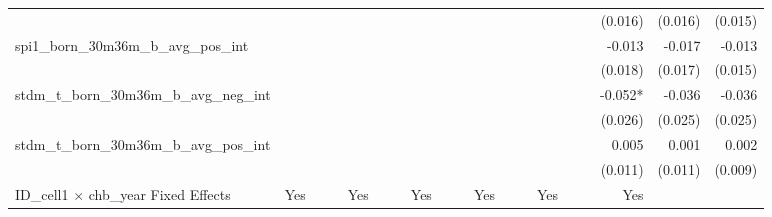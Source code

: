 \begin{tabular}{lrrrrrrrrrrrrrrrrrr}
                                            &              &              &              &              &              &              &              &              &               &              &              &               &              &              &               &      (0.016) &      (0.016) &       (0.015) \\ 
spi1\_born\_30m36m\_b\_avg\_pos\_int        &              &              &              &              &              &              &              &              &               &              &              &               &              &              &               &       -0.013 &       -0.017 &        -0.013 \\ 
                                            &              &              &              &              &              &              &              &              &               &              &              &               &              &              &               &      (0.018) &      (0.017) &       (0.015) \\ 
stdm\_t\_born\_30m36m\_b\_avg\_neg\_int     &              &              &              &              &              &              &              &              &               &              &              &               &              &              &               &      -0.052* &       -0.036 &        -0.036 \\ 
                                            &              &              &              &              &              &              &              &              &               &              &              &               &              &              &               &      (0.026) &      (0.025) &       (0.025) \\ 
stdm\_t\_born\_30m36m\_b\_avg\_pos\_int     &              &              &              &              &              &              &              &              &               &              &              &               &              &              &               &        0.005 &        0.001 &         0.002 \\ 
                                            &              &              &              &              &              &              &              &              &               &              &              &               &              &              &               &      (0.011) &      (0.011) &       (0.009) \\ 
\midrule
ID\_cell1 $\times$ chb\_year Fixed Effects  &          Yes &              &              &          Yes &              &              &          Yes &              &               &          Yes &              &               &          Yes &              &               &          Yes &              &               \\ 

\end{tabular}
